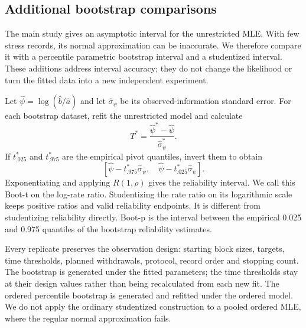 \subsection{Additional bootstrap comparisons}\label{sec:extra-bootstrap}
The main study gives an asymptotic interval for the unrestricted MLE. With few stress records, its normal approximation can be inaccurate. We therefore compare it with a percentile parametric bootstrap interval and a studentized interval. These additions address interval accuracy; they do not change the likelihood or turn the fitted data into a new independent experiment.



Let $\widehat\psi=\log(\widehat b/\widehat a)$ and let $\widehat\sigma_\psi$ be its observed-information standard error. For each bootstrap dataset, refit the unrestricted model and calculate
\begin{equation}
T^*=\frac{\widehat\psi^*-\widehat\psi}{\widehat\sigma^*_\psi}.\label{eq:bootstrap-pivot}
\end{equation}
If $t^*_{.025}$ and $t^*_{.975}$ are the empirical pivot quantiles, invert them to obtain
\begin{equation}
\left[\widehat\psi-t^*_{.975}\widehat\sigma_\psi,\quad
\widehat\psi-t^*_{.025}\widehat\sigma_\psi\right].\label{eq:bootstrap-t}
\end{equation}
Exponentiating and applying $R(1,\rho)$ gives the reliability interval. We call this Boot-t on the log-rate ratio. Studentizing the rate ratio on its logarithmic scale keeps positive ratios and valid reliability endpoints. It is different from studentizing reliability directly. Boot-p is the interval between the empirical 0.025 and 0.975 quantiles of the bootstrap reliability estimates.

Every replicate preserves the observation design: starting block sizes, targets, time thresholds, planned withdrawals, protocol, record order and stopping count. The bootstrap is generated under the fitted parameters; the time thresholds stay at their design values rather than being recalculated from each new fit. The ordered percentile bootstrap is generated and refitted under the ordered model. We do not apply the ordinary studentized construction to a pooled ordered MLE, where the regular normal approximation fails.

